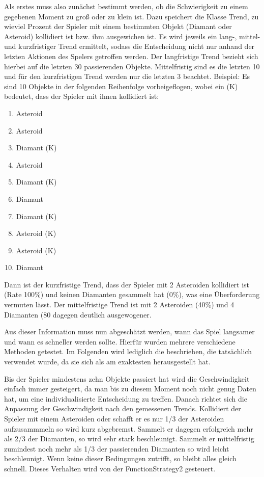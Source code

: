 \documentclass[a4paper,12pt]{scrartcl}
\begin{document}
Als erstes muss also zunächst bestimmt werden, ob die Schwierigkeit zu einem gegebenen
Moment zu groß oder zu klein ist. Dazu speichert die Klasse Trend, zu wieviel Prozent
der Spieler mit einem bestimmten Objekt (Diamant oder Asteroid) kollidiert ist bzw. ihm
ausgewichen ist. Es wird jeweils ein lang-, mittel- und kurzfristiger Trend ermittelt, sodass
die Entscheidung nicht nur anhand der letzten Aktionen des Spelers getroffen werden.
Der langfristige Trend bezieht sich hierbei auf die letzten 30 passierenden Objekte.
Mittelfristig sind es die letzten 10 und für den kurzfristigen Trend werden nur die letzten 3
beachtet.
Beispiel: Es sind 10 Objekte in der folgenden Reihenfolge vorbeigeflogen, wobei ein (K)
bedeutet, dass der Spieler mit ihnen kollidiert ist:
\begin{enumerate}
\item Asteroid
\item Asteroid
\item Diamant (K)
\item Asteroid
\item Diamant (K)
\item Diamant
\item Diamant (K)
\item Asteroid (K)
\item Asteroid (K)
\item Diamant
\end{enumerate}
Dann ist der kurzfristige Trend, dass der Spieler mit 2 Asteroiden kollidiert
ist (Rate 100\%) und keinen Diamanten gesammelt hat (0\%), was eine Überforderung vermuten lässt.
Der mittelfristige Trend ist mit 2 Asteroiden (40\%) und 4 Diamanten (80%
dagegen deutlich ausgewogener.

Aus dieser Information muss nun abgeschätzt werden, wann das Spiel langsamer und wann
es schneller werden sollte. Hierfür wurden mehrere verschiedene Methoden getestet. Im
Folgenden wird lediglich die beschrieben, die tatsächlich verwendet wurde, da sie sich als
am exaktesten herausgestellt hat.

Bis der Spieler mindestens zehn Objekte passiert hat wird die Geschwindigkeit einfach
immer gesteigert, da man bis zu diesem Moment noch nicht genug Daten hat, um
eine individualisierte Entscheidung zu treffen. Danach richtet sich die Anpassung der
Geschwindigkeit nach den gemessenen Trends. Kollidiert der Spieler mit einem Asteroiden
oder schafft er es nur 1/3 der Asteroiden aufzusammmeln so wird kurz abgebremst.
Sammelt er dagegen erfolgreich mehr als 2/3 der Diamanten, so wird sehr stark
beschleunigt. Sammelt er mittelfristig zumindest noch mehr als 1/3 der
passierenden Diamanten so wird leicht beschleunigt. Wenn keine dieser Bedingungen zutrifft, so bleibt alles gleich schnell. Dieses
Verhalten wird von der FunctionStrategy2 gesteuert.
\end{document}
